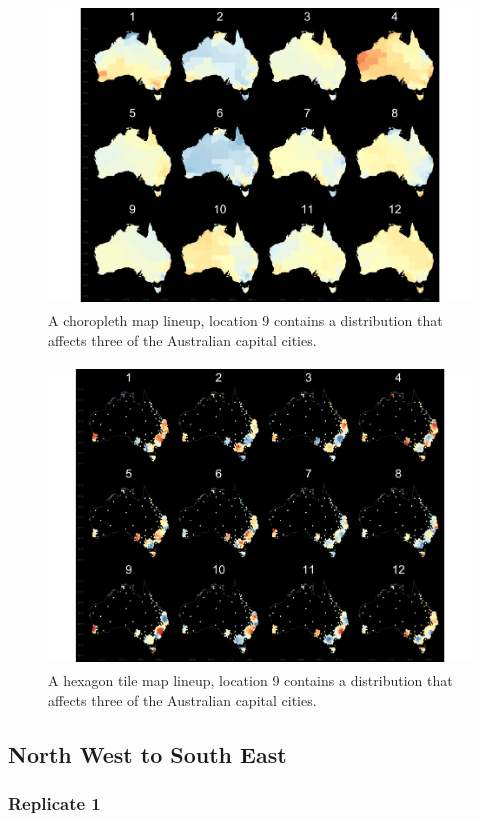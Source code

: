 \documentclass{monashthesis}
\begin{document}
\begin{figure}[H]
\centering
\includegraphics[height=8cm]{lineups/three-geo9-1.pdf}
\caption{\label{fig:three-geo9}A choropleth map lineup, location 9 contains a distribution that affects three of the Australian capital cities.}
\end{figure}

\begin{figure}[H]
\centering
\includegraphics[height=8cm]{lineups/three-hex9-1.pdf}
\caption{\label{fig:three-hex9}A hexagon tile map lineup, location 9 contains a distribution that affects three of the Australian capital cities.}
\end{figure}

\hypertarget{north-west-to-south-east}{%
\subsection{North West to South East}\label{north-west-to-south-east}}

\hypertarget{replicate-1-2}{%
\subsubsection{Replicate 1}\label{replicate-1-2}}
\end{document}
